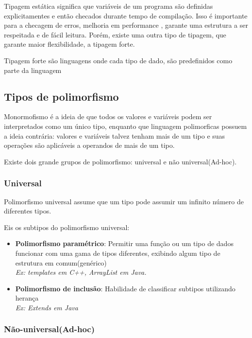 \documentclass[12pt]{article}
\begin{document}
        Tipagem estática significa que variáveis de um programa são definidas explicitamentes e então 
        checados durante tempo de compilação. Isso é importante para a checagem de erros, melhoria em performance , garante 
        uma estrutura a ser respeitada e de fácil leitura. Porém, existe uma outra tipo de tipagem, que garante maior 
        flexibilidade, a tipagem forte. 

        Tipagem forte são linguagens onde cada tipo de dado, são predefinidos como parte da linguagem

    \subsection{Tipos de polimorfismo} 

        Monormofismo é a ideia de que todos os valores e variáveis podem ser interpretados como um único tipo, enquanto
        que linguagem polimorficas possuem a ideia contrária: valores e variáveis talvez tenham mais de um tipo e suas 
        operações são aplicáveis a operandos de mais de um tipo.

        Existe dois grande grupos de polimorfismo: universal e não universal(Ad-hoc).

        \subsubsection{Universal}

        Polimorfismo universal assume que um tipo pode assumir um infinito número de diferentes tipos.

        Eis os subtipos do polimorfismo universal:

        \begin{itemize}
            \item \textbf{Polimorfismo paramétrico}: Permitir uma função ou um tipo de dados funcionar com uma gama de tipos diferentes, 
            exibindo algum tipo de estrutura em comum(genérico) \\ \emph{Ex: templates em C++, ArrayList em Java.}
            \item \textbf{Polimorfismo de inclusão}: Habilidade de classificar subtipos utilizando herança \\ \emph{Ex: Extends em Java}        
        \end{itemize}

        \newpage

        \subsubsection{Não-universal(Ad-hoc)}
\end{document}
